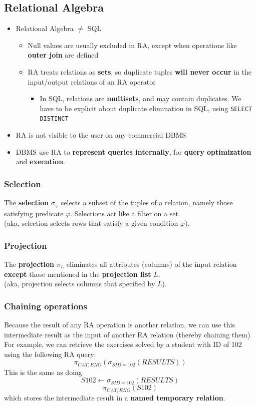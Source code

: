 \documentclass{article}
\begin{document}
\subsection*{Relational Algebra}
\begin{itemize}
    \item Relational Algebra $\neq$ SQL
    \begin{itemize}
        \item Null values are usually excluded in RA, except when operations like \textbf{outer join} are defined
        \item RA treats relations as \textbf{sets}, so duplicate tuples \textbf{will never occur} in the input/output relations of an RA operator
        \begin{itemize}
            \item In SQL, relations are \textbf{multisets}, and may contain duplicates. We have to be explicit about duplicate elimination in SQL, using \verb|SELECT DISTINCT|
        \end{itemize}
    \end{itemize}
    \item RA is not visible to the user on any commercial DBMS
    \item DBMS use RA to \textbf{represent queries internally}, for \textbf{query optimization} and \textbf{execution}.
\end{itemize}

\subsubsection*{Selection}
The \textbf{selection} $\sigma_\varphi$ selects a subset of the tuples of a relation, namely those satisfying predicate $\varphi$. Selections act like a filter on a set.
\\(aka, selection selects rows that satisfy a given condition $\varphi$).
\subsubsection*{Projection}
The \textbf{projection} $\pi_L$ eliminates all attributes (columns) of the input relation \textbf{except} those mentioned in the \textbf{projection list} $L$. 
\\(aka, projection selects columns that specified by $L$).


\subsubsection*{Chaining operations}
Because the result of any RA operation is another relation, we can use this intermediate result as the input of another RA relation (thereby chaining them)
\\For example, we can retrieve the exercises solved by a student with ID of 102 using the following RA query:
$$\pi_{CAT,ENO}(\sigma_{SID=102}(RESULTS))$$
This is the same as doing
$$S102\leftarrow\sigma_{SID=102}(RESULTS)$$
$$\pi_{CAT,ENO}(S102)$$
which stores the intermediate result in a \textbf{named temporary relation}.
\end{document}
